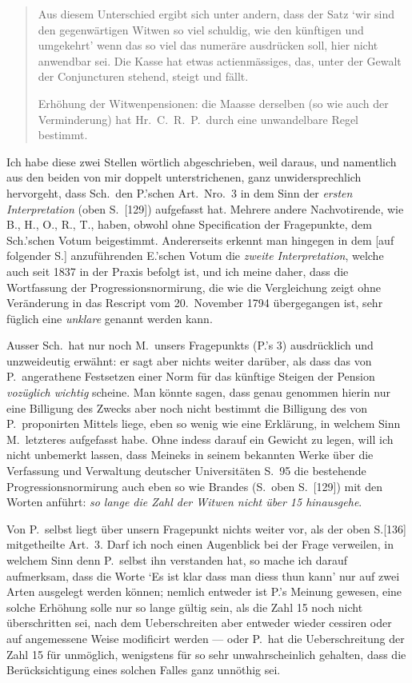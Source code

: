\documentclass[12pt,a4paper]{article}
\begin{document}
\begin{quote}
Aus diesem Unterschied ergibt sich unter andern, dass der Satz `wir sind den gegenw\"artigen Witwen so viel schuldig, wie den k\"unftigen und umgekehrt' wenn das so viel das numer\"are ausdr\"ucken soll, hier nicht anwendbar sei. Die Kasse hat etwas actienm\"assiges, das, unter der Gewalt der Conjuncturen stehend, steigt und f\"allt.

Erh\"ohung der Witwenpensionen: die Maasse derselben (so wie auch der Verminderung) hat Hr.\ C.\ R.\ P.\ durch eine unwandelbare Regel bestimmt.
\end{quote}

Ich habe diese zwei Stellen w\"ortlich abgeschrieben, weil daraus, und namentlich aus den beiden von mir doppelt unterstrichenen, ganz unwidersprechlich hervorgeht, dass Sch.\ den P.'schen Art.\ Nro.\ 3 in dem Sinn der \textit{ersten Interpretation} (oben S.\ [129]) aufgefasst hat. Mehrere andere Nachvotirende, wie B., H., O., R., T., haben, obwohl ohne Specification der Fragepunkte, dem Sch.'schen Votum beigestimmt. Andererseits erkennt man hingegen in dem [auf folgender S.] anzuf\"uhrenden E.'schen Votum die \textit{zweite Interpretation}, welche auch seit 1837 in der Praxis befolgt ist, und ich meine daher, dass die Wortfassung der Progressionsnormirung, die wie die Vergleichung zeigt ohne Ver\"anderung in das Rescript vom 20.\ November 1794 \"ubergegangen ist, sehr f\"uglich eine \textit{unklare} genannt werden kann.

Ausser Sch.\ hat nur noch M.\ unsers Fragepunkts (P.'s 3) ausdr\"ucklich und unzweideutig erw\"ahnt: er sagt aber nichts weiter dar\"uber, als dass das von P.\ angerathene Festsetzen einer Norm f\"ur das k\"unftige Steigen der Pension \textit{voz\"uglich wichtig} scheine. Man k\"onnte sagen, dass genau genommen hierin nur eine Billigung des Zwecks aber noch nicht bestimmt die Billigung des von P.\ proponirten Mittels liege, eben so wenig wie eine Erkl\"arung, in welchem Sinn M.\ letzteres aufgefasst habe. Ohne indess darauf ein Gewicht zu legen, will ich nicht unbemerkt lassen, dass Meineks in seinem bekannten Werke \"uber die Verfassung und Verwaltung deutscher Universit\"aten S.\ 95 die bestehende Progressionsnormirung auch eben so wie Brandes (S.\ oben S.\ [129]) mit den Worten anf\"uhrt: \textit{so lange die Zahl der Witwen nicht \"uber 15 hinausgehe}.

Von P.\ selbst liegt \"uber unsern Fragepunkt nichts weiter vor, als der oben S.[136] mitgetheilte Art.\ 3. Darf ich noch einen Augenblick bei der Frage verweilen, in welchem Sinn denn P.\ selbst ihn verstanden hat, so mache ich darauf aufmerksam, dass die Worte `Es ist klar dass man diess thun kann' nur auf zwei Arten ausgelegt werden k\"onnen; nemlich entweder ist P.'s Meinung gewesen, eine solche Erh\"ohung solle nur so lange g\"ultig sein, als die Zahl 15 noch nicht \"uberschritten sei, nach dem Ueberschreiten aber entweder wieder cessiren oder auf angemessene Weise modificirt werden --- oder P.\ hat die Ueberschreitung der Zahl 15 f\"ur unm\"oglich, wenigstens f\"ur so sehr unwahrscheinlich gehalten, dass die Ber\"ucksichtigung eines solchen Falles ganz unn\"othig sei.
\end{document}
